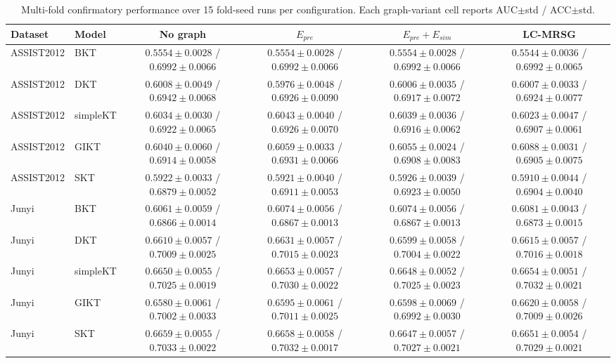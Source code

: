 \documentclass[11pt,a4paper]{article}
\begin{document}
\begin{landscape}
\begin{table}[p]
\centering
\caption{Multi-fold confirmatory performance over 15 fold-seed runs per configuration. Each graph-variant cell reports AUC$\pm$std / ACC$\pm$std.}
\label{tab:performance}
\scriptsize
\begin{tabular}{llcccc}
\toprule
Dataset & Model & No graph & $E_{pre}$ & $E_{pre}+E_{sim}$ & LC-MRSG \\
\midrule
ASSIST2012 & BKT & $0.5554\pm0.0028$ / $0.6992\pm0.0066$ & $0.5554\pm0.0028$ / $0.6992\pm0.0066$ & $0.5554\pm0.0028$ / $0.6992\pm0.0066$ & $0.5544\pm0.0036$ / $0.6992\pm0.0065$ \\
ASSIST2012 & DKT & $0.6008\pm0.0049$ / $0.6942\pm0.0068$ & $0.5976\pm0.0048$ / $0.6926\pm0.0090$ & $0.6006\pm0.0035$ / $0.6917\pm0.0072$ & $0.6007\pm0.0033$ / $0.6924\pm0.0077$ \\
ASSIST2012 & simpleKT & $0.6034\pm0.0030$ / $0.6922\pm0.0065$ & $0.6043\pm0.0040$ / $0.6926\pm0.0070$ & $0.6039\pm0.0036$ / $0.6916\pm0.0062$ & $0.6023\pm0.0047$ / $0.6907\pm0.0061$ \\
ASSIST2012 & GIKT & $0.6040\pm0.0060$ / $0.6914\pm0.0058$ & $0.6059\pm0.0033$ / $0.6931\pm0.0066$ & $0.6055\pm0.0024$ / $0.6908\pm0.0083$ & $0.6088\pm0.0031$ / $0.6905\pm0.0075$ \\
ASSIST2012 & SKT & $0.5922\pm0.0033$ / $0.6879\pm0.0052$ & $0.5921\pm0.0040$ / $0.6911\pm0.0053$ & $0.5926\pm0.0039$ / $0.6923\pm0.0050$ & $0.5910\pm0.0044$ / $0.6904\pm0.0040$ \\
Junyi & BKT & $0.6061\pm0.0059$ / $0.6866\pm0.0014$ & $0.6074\pm0.0056$ / $0.6867\pm0.0013$ & $0.6074\pm0.0056$ / $0.6867\pm0.0013$ & $0.6081\pm0.0043$ / $0.6873\pm0.0015$ \\
Junyi & DKT & $0.6610\pm0.0057$ / $0.7009\pm0.0025$ & $0.6631\pm0.0057$ / $0.7015\pm0.0023$ & $0.6599\pm0.0058$ / $0.7004\pm0.0022$ & $0.6615\pm0.0057$ / $0.7016\pm0.0018$ \\
Junyi & simpleKT & $0.6650\pm0.0055$ / $0.7025\pm0.0019$ & $0.6653\pm0.0057$ / $0.7030\pm0.0022$ & $0.6648\pm0.0052$ / $0.7025\pm0.0023$ & $0.6654\pm0.0051$ / $0.7032\pm0.0021$ \\
Junyi & GIKT & $0.6580\pm0.0061$ / $0.7002\pm0.0033$ & $0.6595\pm0.0061$ / $0.7011\pm0.0025$ & $0.6598\pm0.0069$ / $0.6992\pm0.0030$ & $0.6620\pm0.0058$ / $0.7009\pm0.0026$ \\
Junyi & SKT & $0.6659\pm0.0055$ / $0.7033\pm0.0022$ & $0.6658\pm0.0058$ / $0.7032\pm0.0017$ & $0.6647\pm0.0057$ / $0.7027\pm0.0021$ & $0.6651\pm0.0054$ / $0.7029\pm0.0021$ \\

\end{tabular}
\end{table}
\end{landscape}
\end{document}
